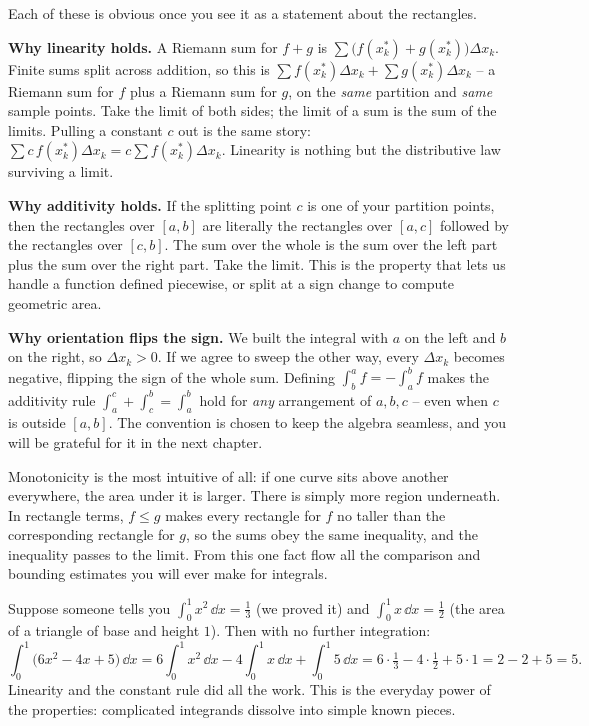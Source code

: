 Each of these is obvious once you see it as a statement about the rectangles.

\textbf{Why linearity holds.} A Riemann sum for $f+g$ is
$\sum \big(f(x_k^\ast)+g(x_k^\ast)\big)\Delta x_k$. Finite sums split across
addition, so this is $\sum f(x_k^\ast)\Delta x_k + \sum g(x_k^\ast)\Delta x_k$ --
a Riemann sum for $f$ plus a Riemann sum for $g$, on the \emph{same} partition
and \emph{same} sample points. Take the limit of both sides; the limit of a sum
is the sum of the limits. Pulling a constant $c$ out is the same story: $\sum
c\,f(x_k^\ast)\Delta x_k = c\sum f(x_k^\ast)\Delta x_k$. Linearity is nothing but
the distributive law surviving a limit.

\textbf{Why additivity holds.} If the splitting point $c$ is one of your
partition points, then the rectangles over $[a,b]$ are literally the rectangles
over $[a,c]$ followed by the rectangles over $[c,b]$. The sum over the whole is
the sum over the left part plus the sum over the right part. Take the limit. This
is the property that lets us handle a function defined piecewise, or split at a
sign change to compute geometric area.

\textbf{Why orientation flips the sign.} We built the integral with $a$ on the
left and $b$ on the right, so $\Delta x_k > 0$. If we agree to sweep the other
way, every $\Delta x_k$ becomes negative, flipping the sign of the whole sum.
Defining $\int_b^a f = -\int_a^b f$ makes the additivity rule
$\int_a^c + \int_c^b = \int_a^b$ hold for \emph{any} arrangement of $a,b,c$ --
even when $c$ is outside $[a,b]$. The convention is chosen to keep the algebra
seamless, and you will be grateful for it in the next chapter.

\begin{intuitionbox}
Monotonicity is the most intuitive of all: if one curve sits above another
everywhere, the area under it is larger. There is simply more region underneath.
In rectangle terms, $f \le g$ makes every rectangle for $f$ no taller than the
corresponding rectangle for $g$, so the sums obey the same inequality, and the
inequality passes to the limit. From this one fact flow all the comparison and
bounding estimates you will ever make for integrals.
\end{intuitionbox}

\begin{example}
\label{ch20:ex-properties}
Suppose someone tells you $\int_0^1 x^2\,\dd x = \tfrac13$ (we proved it) and
$\int_0^1 x\,\dd x = \tfrac12$ (the area of a triangle of base and height $1$).
Then with no further integration:
\[
  \int_0^1 \big(6x^2 - 4x + 5\big)\,\dd x
  = 6\!\int_0^1\! x^2\,\dd x - 4\!\int_0^1\! x\,\dd x + \int_0^1\! 5\,\dd x
  = 6\cdot\tfrac13 - 4\cdot\tfrac12 + 5\cdot 1 = 2 - 2 + 5 = 5.
\]
Linearity and the constant rule did all the work. This is the everyday power of
the properties: complicated integrands dissolve into simple known pieces.
\end{example}

